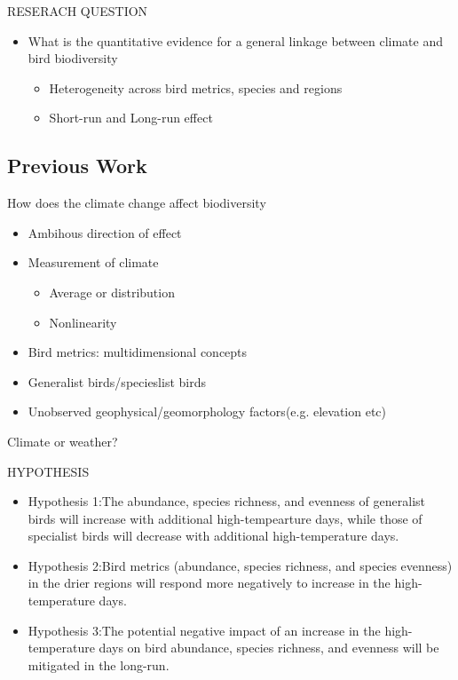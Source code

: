 \documentclass{beamer}
\begin{document}
\begin{frame}{RESERACH QUESTION}
  \begin{itemize}
    \item What is the quantitative evidence for a general linkage between climate and bird biodiversity
    \begin{itemize}
      \item Heterogeneity across bird metrics, species and regions
      \item Short-run and Long-run effect
    \end{itemize}
  \end{itemize}
\end{frame}

\subsection{Previous Work}

\begin{frame}{How does the climate change affect biodiversity}
  \begin{itemize}
    \item Ambihous direction of effect
    \item Measurement of climate
    \begin{itemize}
      \item Average or distribution
      \item Nonlinearity
    \end{itemize}
    \item Bird metrics: multidimensional concepts
    \item Generalist birds/specieslist birds
    \item Unobserved geophysical/geomorphology factors(e.g. elevation etc)
  \end{itemize}
\end{frame}

\begin{frame}{Climate or weather?}
  \begin{figure}[h]
  \centering
  \end{figure}
\end{frame}

\begin{frame}{HYPOTHESIS}
  \begin{itemize}
    \item \alert{Hypothesis 1:}The abundance, species richness, and evenness of generalist birds will increase with additional high-tempearture days, while those of specialist birds will decrease with additional high-temperature days.
    \item \alert{Hypothesis 2:}Bird metrics (abundance, species richness, and species evenness) in the drier regions will respond more negatively to increase in the high-temperature days.
    \item \alert{Hypothesis 3:}The potential negative impact of an increase in the high-temperature days on bird abundance, species richness, and evenness will be mitigated in the long-run.
  \end{itemize}
\end{frame}
\end{document}
